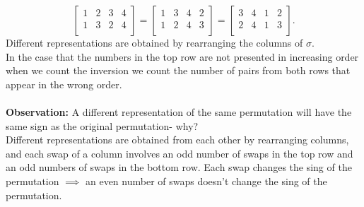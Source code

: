\documentclass{report}
\begin{document}
 \[
\begin{bmatrix}
1 & 2 & 3 & 4\\
1 & 3 & 2 & 4\\
\end{bmatrix} = \begin{bmatrix}
1 &  3& 4 & 2\\
1 & 2 & 4 & 3\\
\end{bmatrix} = \begin{bmatrix}
3 & 4 & 1 & 2\\
2 & 4 & 1 & 3\\
\end{bmatrix} 
.\] 
Different representations are obtained by rearranging the columns of $\sigma$.\\
In the case that the numbers in the top row are not presented in increasing order when we count the inversion we count the number of pairs from both rows that appear in the wrong order.\\
\\
\textbf{Observation:}  A different representation of the same permutation will have the same sign as the original permutation- why?\\
Different representations are obtained from each other by rearranging columns, and each swap of a column involves an odd number of swaps in the top row and an odd numbers of swaps in the bottom row. Each swap changes the sing of the permutation $\implies$ an even number of swaps doesn't change the sing of the permutation.\\
\\
\end{document}
